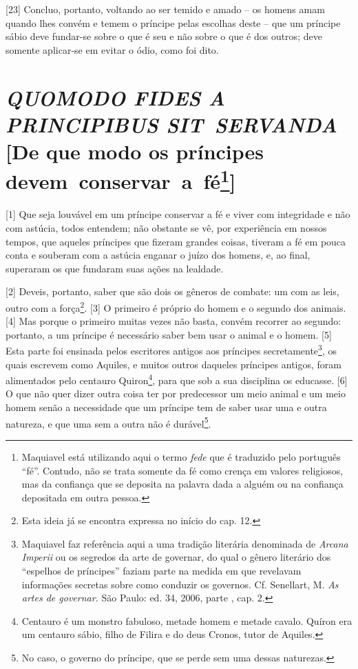 {[}23{]} Concluo, portanto, voltando ao ser temido e amado -- os homens
amam quando lhes convém e temem o príncipe pelas escolhas deste -- que
um príncipe sábio deve fundar-se sobre o que é seu e não sobre o que é
dos outros; deve somente aplicar-se em evitar o ódio, como foi dito.

\quebra\section{\emph{QUOMODO FIDES A PRINCIPIBUS SIT~SERVANDA}\break
{[}De que modo os príncipes devem~conservar~a~fé\protect\footnote{Maquiavel está
  utilizando aqui o termo \emph{fede} que é traduzido pelo português
  ``fé''. Contudo, não se trata somente da fé como crença em valores
  religiosos, mas da confiança que se deposita na palavra dada a alguém
  ou na confiança depositada em outra pessoa.}{]}}

{[}1{]} Que seja louvável em um príncipe conservar a fé e viver com
integridade e não com astúcia, todos entendem; não obstante se vê, por
experiência em nossos tempos, que aqueles príncipes que fizeram grandes
coisas, tiveram a fé em pouca conta e souberam com a astúcia enganar o
juízo dos homens, e, ao final, superaram os que fundaram suas ações na
lealdade.

{[}2{]} Deveis, portanto, saber que são dois os gêneros de combate: um
com as leis, outro com a força\footnote{Esta ideia já se encontra
  expressa no início do cap. 12.}. {[}3{]} O primeiro é próprio do homem
e o segundo dos animais. {[}4{]} Mas porque o primeiro muitas vezes não
basta, convém recorrer ao segundo: portanto, a um príncipe é necessário
saber bem usar o animal e o homem. {[}5{]} Esta parte foi ensinada pelos
escritores antigos aos príncipes secretamente\footnote{Maquiavel faz
  referência aqui a uma tradição literária denominada de \emph{Arcana
  Imperii} ou os segredos da arte de governar, do qual o gênero
  literário dos ``espelhos de príncipes'' faziam parte na medida em que
  revelavam informações secretas sobre como conduzir os governos. Cf.
  Senellart, M. \emph{As artes de governar.} São Paulo: ed. 34, 2006,
  parte , cap. 2.}, os quais escrevem como Aquiles, e muitos outros
daqueles príncipes antigos, foram alimentados pelo centauro
Quiron\footnote{Centauro é um monstro fabuloso, metade homem e metade
  cavalo. Quíron era um centauro sábio, filho de Filira e do deus
  Cronos, tutor de Aquiles.}, para que sob a sua disciplina os educasse.
{[}6{]} O que não quer dizer outra coisa ter por predecessor um meio
animal e um meio homem senão a necessidade que um príncipe tem de saber
usar uma e outra natureza, e que uma sem a outra não é durável\footnote{No
  caso, o governo do príncipe, que se perde sem uma dessas naturezas.}.

